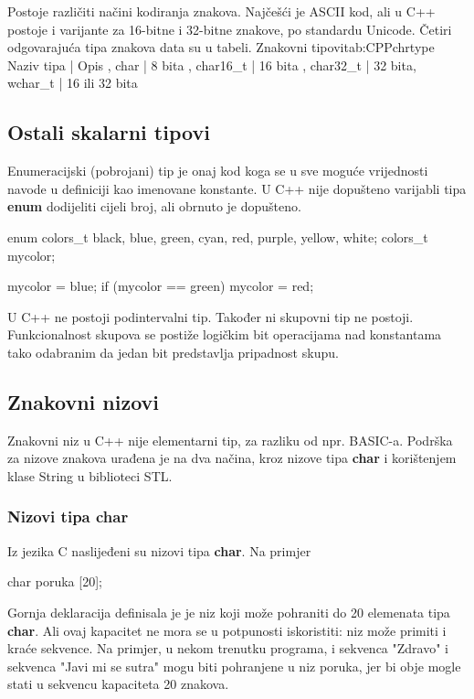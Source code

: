 \documentclass[11pt]{book}
\begin{document}
Postoje različiti načini kodiranja znakova. Najčešći je ASCII kod, ali u C++ postoje i varijante za 16-bitne i 32-bitne znakove, po standardu Unicode. Četiri odgovarajuća tipa znakova data su u tabeli.
 {Znakovni tipovi}{tab:CPPchrtype}
{
  Naziv tipa | Opis ,
  char | 8 bita ,
  char16\_t | 16  bita ,
  char32\_t | 32 bita,
  wchar\_t | 16 ili 32 bita
}


\subsection{Ostali skalarni tipovi}

Enumeracijski (pobrojani) tip je onaj kod koga se u sve moguće vrijednosti navode u definiciji kao imenovane konstante.  U C++ nije dopušteno varijabli tipa \textbf{enum} dodijeliti cijeli broj, ali obrnuto je dopušteno.

\begin{shortlisting}
  enum colors_t {black, blue, green, cyan, red, purple, yellow, white};
  colors_t mycolor;

  mycolor = blue;
  if (mycolor == green) mycolor = red;
\end{shortlisting}

U C++ ne postoji podintervalni tip. Također ni skupovni tip ne postoji. Funkcionalnost skupova se postiže logičkim bit operacijama nad konstantama tako odabranim da jedan bit predstavlja pripadnost skupu.


\subsection{Znakovni nizovi}
Znakovni niz u C++ nije elementarni tip, za razliku od npr. BASIC-a. Podrška za nizove znakova urađena je na dva načina, kroz nizove tipa \textbf{char} i korištenjem klase String u biblioteci STL.

\subsubsection{Nizovi tipa char}
Iz jezika C naslijeđeni su nizovi tipa \textbf{char}. Na primjer

\begin{shortlisting}
  char poruka [20];
\end{shortlisting}

Gornja deklaracija definisala je je niz koji može pohraniti do 20 elemenata tipa \textbf{char}. Ali ovaj kapacitet ne mora se u potpunosti iskoristiti: niz može primiti i kraće sekvence. Na primjer, u nekom trenutku programa, i sekvenca "Zdravo" i sekvenca "Javi mi se sutra" mogu biti pohranjene u niz poruka, jer bi obje mogle stati u sekvencu kapaciteta 20 znakova.
\end{document}
